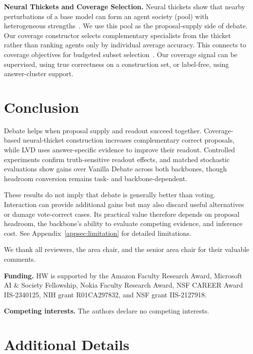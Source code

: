 \documentclass{article}
\newcommand{\appref}[1]{Appendix~\ref{#1}}
\begin{document}
\textbf{Neural Thickets and Coverage Selection.}
Neural thickets show that nearby perturbations of a base model can form an
agent society (pool) with heterogeneous strengths~\citep{gan2026neuralthicketsdiversetask,qiu2026evolutionstrategiesscalellm}. We use
this pool as the proposal-supply side of debate. Our coverage constructor
selects complementary specialists from the thicket rather than ranking agents
only by individual average accuracy. This connects to coverage objectives for
budgeted subset selection~\citep{nemhauser1978analysis}.
Our coverage signal can be supervised, using true correctness on a construction
set, or label-free, using answer-cluster support.

\section{Conclusion}

Debate helps when proposal supply and readout succeed together. Coverage-based neural-thicket construction increases complementary correct proposals, while LVD uses answer-specific evidence to improve their readout. Controlled experiments confirm truth-sensitive readout effects, and matched stochastic evaluations show gains over Vanilla Debate across both backbones, though headroom conversion remains task- and backbone-dependent.

These results do not imply that debate is generally better than voting. Interaction can provide additional gains but may also discard useful alternatives or damage vote-correct cases. Its practical value therefore depends on proposal headroom, the backbone's ability to evaluate competing evidence, and inference cost. See
\appref{appsec:limitation} for detailed limitations.

\begin{ack}
We thank all reviewers, the area chair, and the senior area chair for their
valuable comments.

\textbf{Funding.}
HW is supported by the Amazon Faculty Research Award, Microsoft AI \& Society
Fellowship, Nokia Faculty Research Award, NSF CAREER Award IIS-2340125,
NIH grant R01CA297832, and NSF grant IIS-2127918.

\textbf{Competing interests.}
The authors declare no competing interests.
\end{ack}




\appendix

\section{Additional Details}
\end{document}
